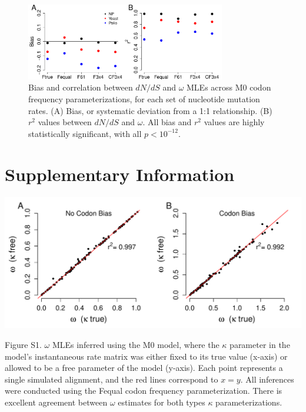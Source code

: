 \documentclass{pnastwo}
\begin{document}
\bigskip
\bigskip
\bigskip
\bigskip

\begin{figure}[htbp]
\centerline{\includegraphics[width=8.7cm]{figures/MainText/nyp_bias_r2.pdf}}
\caption{\label{nyp_bias_r2} Bias and correlation between $dN/dS$ and $\omega$ MLEs across M0 codon frequency parameterizations, for each set of nucleotide mutation rates. (A) Bias, or systematic deviation from a 1:1 relationship. (B) $r^2$ values between $dN/dS$ and $\omega$. All bias and $r^2$ values are highly statistically significant, with all $p < 10^{-12}$.}
\end{figure}

\clearpage
\newpage

\section{Supplementary Information}

\bigskip
\bigskip
\bigskip
\bigskip

\centerline{\includegraphics[width=5.5in]{figures/SI/omega_kappafree_kappatrue.pdf}}
\noindent Figure S1. $\omega$ MLEs inferred using the M0 model, where the $\kappa$ parameter in the model's instantaneous rate matrix was either fixed to its true value (x-axis) or allowed to be a free parameter of the model (y-axis). Each point represents a single simulated alignment, and the red lines correspond to $x=y$. All inferences were conducted using the Fequal codon frequency parameterization. There is excellent agreement between $\omega$ estimates for both types $\kappa$ parameterizations.
\end{document}
